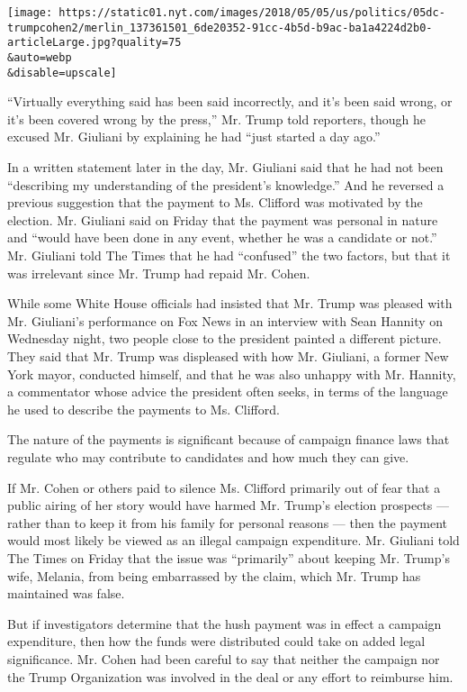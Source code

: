 \texttt{[image: https://static01.nyt.com/images/2018/05/05/us/politics/05dc-trumpcohen2/merlin\_137361501\_6de20352-91cc-4b5d-b9ac-ba1a4224d2b0-articleLarge.jpg?quality=75\\\&auto=webp\\\&disable=upscale]}

``Virtually everything said has been said incorrectly, and it's been
said wrong, or it's been covered wrong by the press,'' Mr. Trump told
reporters, though he excused Mr. Giuliani by explaining he had ``just
started a day ago.''

In a written statement later in the day, Mr. Giuliani said that he had
not been ``describing my understanding of the president's knowledge.''
And he reversed a previous suggestion that the payment to Ms. Clifford
was motivated by the election. Mr. Giuliani said on Friday that the
payment was personal in nature and ``would have been done in any event,
whether he was a candidate or not.'' Mr. Giuliani told The Times that he
had ``confused'' the two factors, but that it was irrelevant since Mr.
Trump had repaid Mr. Cohen.

While some White House officials had insisted that Mr. Trump was pleased
with Mr. Giuliani's performance on Fox News in an interview with Sean
Hannity on Wednesday night, two people close to the president painted a
different picture. They said that Mr. Trump was displeased with how Mr.
Giuliani, a former New York mayor, conducted himself, and that he was
also unhappy with Mr. Hannity, a commentator whose advice the president
often seeks, in terms of the language he used to describe the payments
to Ms. Clifford.

The nature of the payments is significant because of campaign finance
laws that regulate who may contribute to candidates and how much they
can give.

If Mr. Cohen or others paid to silence Ms. Clifford primarily out of
fear that a public airing of her story would have harmed Mr. Trump's
election prospects --- rather than to keep it from his family for
personal reasons --- then the payment would most likely be viewed as an
illegal campaign expenditure. Mr. Giuliani told The Times on Friday that
the issue was ``primarily'' about keeping Mr. Trump's wife, Melania,
from being embarrassed by the claim, which Mr. Trump has maintained was
false.

But if investigators determine that the hush payment was in effect a
campaign expenditure, then how the funds were distributed could take on
added legal significance. Mr. Cohen had been careful to say that neither
the campaign nor the Trump Organization was involved in the deal or any
effort to reimburse him.

